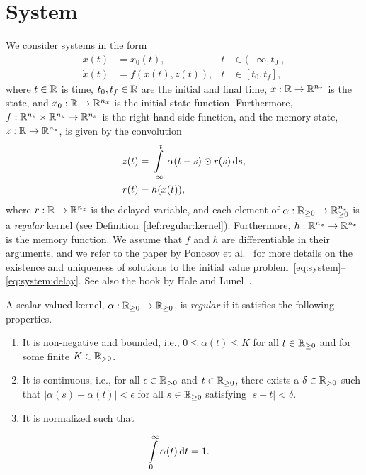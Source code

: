\section{System}\label{sec:system}
We consider systems in the form
%
\begin{subequations}\label{eq:system}
	\begin{align}
		\label{eq:system:x0}
		x(t) &= x_0(t), & t &\in (-\infty, t_0], \\
		\label{eq:system:x}
		\dot x(t) &= f(x(t), z(t)), & t &\in [t_0, t_f],
	\end{align}
\end{subequations}
%
where $t \in \mathbb{R}$ is time, $t_0, t_f \in \mathbb{R}$ are the initial and final time, $x: \mathbb{R} \rightarrow \mathbb{R}^{n_x}$ is the state, and $x_0: \mathbb{R} \rightarrow \mathbb{R}^{n_x}$ is the initial state function. Furthermore, $f: \mathbb{R}^{n_x} \times \mathbb{R}^{n_z} \rightarrow \mathbb{R}^{n_x}$ is the right-hand side function, and the memory state, $z: \mathbb{R} \rightarrow \mathbb{R}^{n_z}$, is given by the convolution
%
\begin{subequations}\label{eq:system:delay}
	\begin{align}
		\label{eq:system:z}
		z(t) &= \int\limits_{-\infty}^t \alpha(t - s) \odot r(s) \,\mathrm{d} s, \\
		\label{eq:system:r}
		r(t) &= h(x(t)),
	\end{align}
\end{subequations}
%
where $r: \mathbb{R} \rightarrow \mathbb{R}^{n_z}$ is the delayed variable, and each element of $\alpha: \mathbb{R}_{\geq 0} \rightarrow \mathbb{R}_{\geq 0}^{n_z}$ is a \emph{regular} kernel (see Definition~\ref{def:regular:kernel}). Furthermore, $h: \mathbb{R}^{n_x} \rightarrow \mathbb{R}^{n_z}$ is the memory function. We assume that $f$ and $h$ are differentiable in their arguments, and we refer to the paper by Ponosov et al.~\cite[Thm.~1]{Ponosov:etal:2004} for more details on the existence and uniqueness of solutions to the initial value problem~\eqref{eq:system}--\eqref{eq:system:delay}. See also the book by Hale and Lunel~\cite{Hale:Lunel:1993}.
%
\begin{definition}\label{def:regular:kernel}
	A scalar-valued kernel, $\alpha: \mathbb{R}_{\geq 0} \rightarrow \mathbb{R}_{\geq 0}$, is \emph{regular} if it satisfies the following properties.
	\begin{enumerate}
		\item It is non-negative and bounded, i.e., $0 \leq \alpha(t) \leq K$ for all $t \in \mathbb{R}_{\geq 0}$ and for some finite $K \in \mathbb{R}_{> 0}$.
		\item It is continuous, i.e., for all $\epsilon \in \mathbb{R}_{> 0}$ and $t \in \mathbb{R}_{\geq 0}$, there exists a $\delta \in \mathbb{R}_{> 0}$ such that $|\alpha(s) - \alpha(t)| < \epsilon$ for all $s \in \mathbb{R}_{\geq 0}$ satisfying $|s - t| < \delta$.
		\item It is normalized such that
	\end{enumerate}
	\begin{align}\label{eq:kernel:normalization}
		\int\limits_0^\infty \alpha(t) \,\mathrm{d} t &= 1.
	\end{align}
\end{definition}
